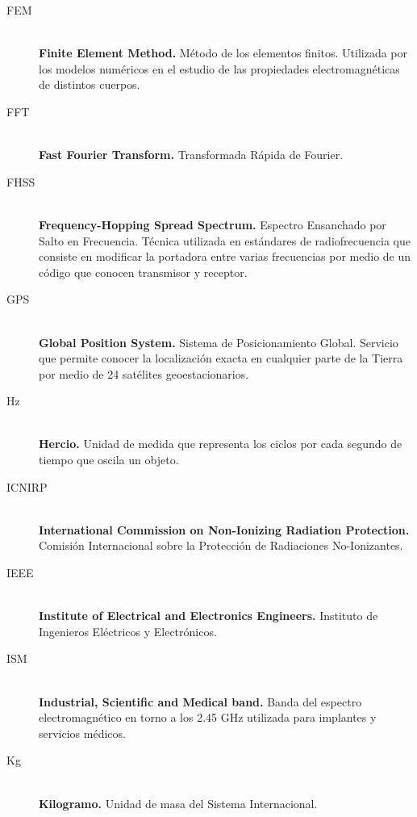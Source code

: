\begin{description}
    \item[FEM]\mbox{}\\
    \textbf{Finite Element Method.} Método de los elementos finitos. Utilizada por los modelos numéricos en el estudio de las propiedades electromagnéticas de distintos cuerpos.

    \item[FFT]\mbox{}\\
    \textbf{Fast Fourier Transform.} Transformada Rápida de Fourier.

    \item[FHSS]\mbox{}\\
    \textbf{Frequency-Hopping Spread Spectrum.} Espectro Ensanchado por Salto en Frecuencia. Técnica utilizada en estándares de radiofrecuencia que consiste en modificar la portadora entre varias frecuencias por medio de un código que conocen transmisor y receptor.

    \item[GPS]\mbox{}\\
    \textbf{Global Position System.} Sistema de Posicionamiento Global. Servicio que permite conocer la localización exacta en cualquier parte de la Tierra por medio de 24 satélites geoestacionarios.

    \item[Hz]\mbox{}\\
    \textbf{Hercio.} Unidad de medida que representa los ciclos por cada segundo de tiempo que oscila un objeto.

    \item[ICNIRP]\mbox{}\\
    \textbf{International Commission on Non-Ionizing Radiation Protection.} Comisión Internacional sobre la Protección de Radiaciones No-Ionizantes.

    \item[IEEE]\mbox{}\\
    \textbf{Institute of Electrical and Electronics Engineers.} Instituto de Ingenieros Eléctricos y Electrónicos.

    \item[ISM]\mbox{}\\
    \textbf{Industrial, Scientific and Medical band.} Banda del espectro electromagnético en torno a los 2.45 GHz utilizada para implantes y servicios médicos.

    \item[Kg]\mbox{}\\
    \textbf{Kilogramo.} Unidad de masa del Sistema Internacional.


\end{description}
